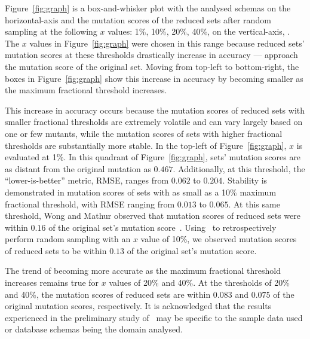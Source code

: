 Figure~\ref{fig:graph} is a box-and-whisker plot with the analysed schemas on the horizontal-axis and the mutation scores of the reduced
sets after random sampling at the following $x$ values: 1\%, 10\%, 20\%, 40\%, on the vertical-axis, .
The $x$ values in Figure~\ref{fig:graph} were chosen in this range because reduced sets' mutation scores at these thresholds
drastically increase in accuracy --- approach the mutation score of the original set. Moving from top-left to bottom-right, the boxes in
Figure~\ref{fig:graph} show this increase in accuracy by becoming smaller as the maximum fractional threshold increases.

This increase in accuracy occurs because the mutation scores of reduced sets with smaller fractional thresholds are extremely volatile
and can vary largely based on one or few mutants, while the mutation scores of sets with higher fractional thresholds are substantially
more stable. In the top-left of Figure~\ref{fig:graph}, $x$ is evaluated at 1\%. In this quadrant of Figure~\ref{fig:graph}, sets' mutation
scores are as distant from the original mutation as $0.467$. Additionally, at this threshold, the ``lower-is-better'' metric,
RMSE, ranges from $0.062$ to $0.204$. Stability is demonstrated in mutation scores of sets with as small as a 10\% maximum fractional
threshold, with RMSE ranging from $0.013$ to $0.065$. At this same threshold, Wong and Mathur observed that mutation
scores of reduced sets were within $0.16$ of the original set's mutation score~\cite{mathur1994empirical, wong1993mutation}. Using \mr~to
retrospectively perform random sampling with an $x$ value of 10\%, we observed mutation scores of reduced sets to be within $0.13$ of the
original set's mutation score.

The trend of becoming more accurate as the maximum fractional threshold increases remains true for $x$ values of 20\% and 40\%. At the
thresholds of 20\% and 40\%, the mutation scores of reduced sets are within $0.083$ and $0.075$ of the original mutation scores,
respectively. It is acknowledged that the results experienced in the preliminary study of \mr~may be specific to the sample data used or
database schemas being the domain analysed.
